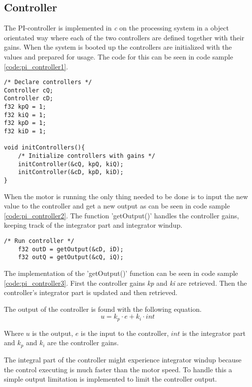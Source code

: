 \subsection{Controller}

The PI-controller is implemented in \textit{c} on the processing system in a object orientated way where each of the two controllers are defined together with their gains. When the system is booted up the controllers are initialized with the values and prepared for usage. The code for this can be seen in code sample \ref{code:pi_controller1}.

\begin{lstlisting}[style=c, caption=Initialization of PI-controller., label=code:pi_controller1]
/* Declare controllers */
Controller cQ;
Controller cD;
f32 kpQ = 1;
f32 kiQ = 1;
f32 kpD = 1;
f32 kiD = 1;

void initControllers(){
    /* Initialize controllers with gains */
    initController(&cQ, kpQ, kiQ);
    initController(&cD, kpD, kiD);
}
\end{lstlisting}

When the motor is running the only thing needed to be done is to input the new value to the controller and get a new output as can be seen in code sample \ref{code:pi_controller2}. The function 'getOutput()' handles the controller gains, keeping track of the integrator part and integrator windup.

\begin{lstlisting}[style=c, caption=Usage of PI-controller., label=code:pi_controller2]
    /* Run controller */
    f32 outD = getOutput(&cD, iD);
    f32 outQ = getOutput(&cQ, iQ);
\end{lstlisting}

The implementation of the 'getOutput()' function can be seen in code sample \ref{code:pi_controller3}.
First the controller gains \textit{kp} and \textit{ki} are retrieved. Then the controller's integrator part is updated and then retrieved.

The output of the controller is found with the following equation.
\begin{equation}
    u = k_p \cdot e + k_i \cdot int
\end{equation}

Where $u$ is the output, $e$ is the input to the controller, $int$ is the integrator part and $k_p$ and $k_i$ are the controller gains.

The integral part of the controller might experience integrator windup because the control executing is much faster than the motor speed. To handle this a simple output limitation is implemented to limit the controller output.




